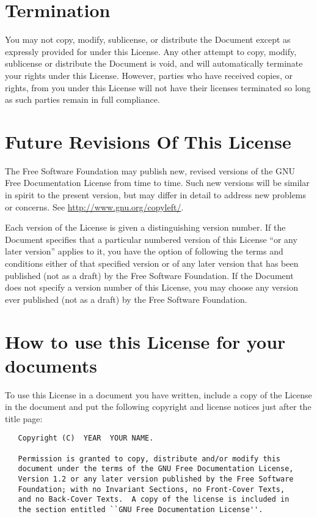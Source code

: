 \section{Termination}
\label{sec:License-GFDL-9}

You may not copy, modify, sublicense, or distribute the Document
except as expressly provided for under this License.  Any other
attempt to copy, modify, sublicense or distribute the Document is
void, and will automatically terminate your rights under this License.
However, parties who have received copies, or rights, from you under
this License will not have their licenses terminated so long as such
parties remain in full compliance.

\section{Future Revisions Of This License}
\label{sec:License-GFDL-10}

The Free Software Foundation may publish new, revised versions of the
GNU Free Documentation License from time to time.  Such new versions
will be similar in spirit to the present version, but may differ in
detail to address new problems or concerns.  See
\url{http://www.gnu.org/copyleft/}.

Each version of the License is given a distinguishing version number.
If the Document specifies that a particular numbered version of this
License ``or any later version'' applies to it, you have the option of
following the terms and conditions either of that specified version or
of any later version that has been published (not as a draft) by the
Free Software Foundation.  If the Document does not specify a version
number of this License, you may choose any version ever published (not
as a draft) by the Free Software Foundation.

\section{How to use this License for your documents}
\label{sec:License-GFDL-11}

To use this License in a document you have written, include a copy of
the License in the document and put the following copyright and
license notices just after the title page:

\begin{verbatim}
   Copyright (C)  YEAR  YOUR NAME.

   Permission is granted to copy, distribute and/or modify this
   document under the terms of the GNU Free Documentation License,
   Version 1.2 or any later version published by the Free Software
   Foundation; with no Invariant Sections, no Front-Cover Texts,
   and no Back-Cover Texts.  A copy of the license is included in
   the section entitled ``GNU Free Documentation License''.
\end{verbatim}

